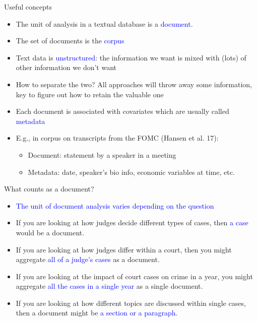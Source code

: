 \documentclass[english]{beamer}
\begin{document}
\begin{frame}{Useful concepts}

\begin{itemize}
\setlength{\itemsep}{1em}
\item The unit of analysis in a textual database is a \textcolor{blue}{document}.
\item The set of documents is the \textcolor{blue}{corpus}
\pause
\item Text data is \textcolor{blue}{unstructured}: the information we want is mixed with (lots) of other information we don't want
\item How to separate the two? All approaches will throw away some information, key to figure out how to retain the valuable one
\pause
\item Each document is associated with covariates which are usually called \textcolor{blue}{metadata}
\pause
\item E.g., in corpus on transcripts from the FOMC \small{(Hansen et al. 17)}: 
\vspace{4pt}
\begin{itemize}
\setlength{\itemsep}{0.3em}
\setlength{\itemindent}{-0.9em}
\item Document: statement by a speaker in a meeting
\item Metadata: date, speaker's bio info, economic variables at time, etc. 
\end{itemize}
\end{itemize}
\end{frame}

\begin{frame}{What counts as a document?}
\begin{itemize}
\setlength{\itemsep}{1em}
\item \textcolor{blue}{The unit of document analysis varies depending on the question}
\pause
\item If you are looking at how judges decide different types of cases, then \textcolor{blue}{a case} would be a document.
\pause
\item If you are looking at how judges differ within a court, then you might aggregate \textcolor{blue}{all of a judge's cases} as a document.
\pause
\item If you are looking at the impact of court cases on crime in a year, you might aggregate \textcolor{blue}{all the cases in a single year} as a single document. 
\pause
\item If you are looking at how different topics are discussed within single cases, then a document might be \textcolor{blue}{a section or a paragraph}.
\end{itemize}
\end{frame}
\end{document}
